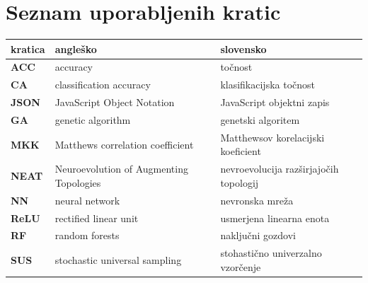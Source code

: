 \documentclass[a4paper,12pt,openright]{book}
\newcommand{\clearemptydoublepage}{\newpage{\pagestyle{empty}\cleardoublepage}}
\begin{document}
    \clearemptydoublepage


    \chapter*{Seznam uporabljenih kratic}

    \noindent\begin{tabular}{p{}|p{}|p{}}    %
                 \textbf{kratica} & \textbf{angleško}                       & \textbf{slovensko}                     \\ \hline
                 \textbf{ACC}     & accuracy                                & točnost                                \\
                 \textbf{CA}      & classification accuracy                 & klasifikacijska točnost                \\
                 \textbf{JSON}    & JavaScript Object Notation              & JavaScript objektni zapis              \\
                 \textbf{GA}      & genetic algorithm                       & genetski algoritem                     \\
                 \textbf{MKK}     & Matthews correlation coefficient        & Matthewsov korelacijski koeficient     \\
                 \textbf{NEAT}    & Neuroevolution of Augmenting Topologies & nevroevolucija razširjajočih topologij \\
                 \textbf{NN}      & neural network                          & nevronska mreža                        \\
                 \textbf{ReLU}    & rectified linear unit                   & usmerjena linearna enota               \\
                 \textbf{RF}      & random forests                          & naključni gozdovi                       \\
                 \textbf{SUS}     & stochastic universal sampling           & stohastično univerzalno vzorčenje      \\
    \end{tabular}



    \clearemptydoublepage
\end{document}
